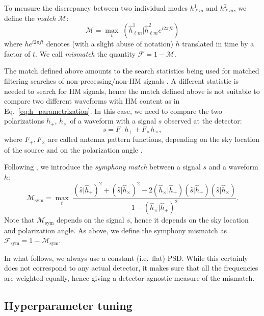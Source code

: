 \documentclass[twocolumn,showpacs,preprintnumbers,nofootinbib,prd,
superscriptaddress,10pt]{revtex4-1}
\newcommand{\rescalar}[2]{( #1 |#2 )}
\begin{document}
To measure the discrepancy between two individual modes $h^1_{\ell m}$ and $h^2_{\ell m}$, we define the {\it match} 
$\mathcal{M}$:
\begin{equation}\label{eq:match}
	\mathcal{M} = \max_t \; \rescalar{\hat{h}^1_{\ell m}}{\hat{h}^2_{\ell m} e^{i 2\pi ft}}
\end{equation}
where $h e^{i 2\pi ft}$ denotes (with a slight abuse of notation) $h$ translated in time by a factor of $t$.
We call {\it mismatch} the quantity $\mathcal{F} = 1 - \mathcal{M}$.

The match defined above amounts to the search statistics being used for matched filtering searches of non-precessing/non-HM signals \cite{Harry:2016ijz}.
A different statistic is needed to search for HM signals, hence the match defined above is not suitable to compare two different waveforms with HM content 
as in Eq.~\eqref{eq:h_parametrization}.
In this case, we need to compare the two polarizations $h_+$, $h_\times$ of a waveform with a signal $s$ observed at the 
detector:
\begin{equation}
	s = F_+ h_+ + F_\times h_\times,
\end{equation}
where $F_+, F_\times$ are called antenna pattern functions, depending on the sky location of the source and on the polarization angle \cite{Maggiore:2007ulw}.

Following \cite{Harry:2017weg}, we introduce the 
{\it symphony match} 
between a signal $s$ and a waveform $h$:
\begin{equation}\label{eq:match_sym}
\mathcal{M}_\mathrm{sym} 
	= \max_t \;
		\frac{ \rescalar{\hat{s}}{\hat{h}_+}^2 + \rescalar{\hat{s}}{\hat{h}_\times}^2 - 2 \rescalar{\hat{h}_\times}{\hat{h}_+} \rescalar{\hat{s}}{\hat{h}_+} \rescalar{\hat{s}}{\hat{h}_\times}}
		{1-\rescalar{\hat{h}_\times}{\hat{h}_+}^2}.
\end{equation}
Note that $\mathcal{M}_\mathrm{sym}$ depends on the signal $s$, hence it depends on the sky location and polarization angle.
As above, we define the symphony mismatch as $\mathcal{F}_\mathrm{sym} = 1 - \mathcal{M}_\mathrm{sym}$.

In what follows, we always use a constant (i.e.~flat) PSD. While this certainly does not correspond to any actual detector, it makes sure that all the frequencies are weighted equally, hence giving a detector agnostic measure of the mismatch.

\subsection{Hyperparameter tuning}
\label{sec:hyperparameter}
\end{document}
